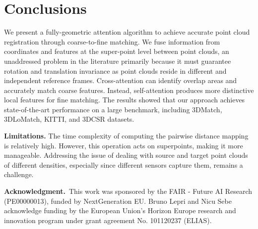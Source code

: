 \section{Conclusions}
We present a fully-geometric attention algorithm to achieve accurate point cloud registration through coarse-to-fine matching.
We fuse information from coordinates and features at the super-point level between point clouds, an unaddressed problem in the literature primarily because it must guarantee rotation and translation invariance as point clouds reside in different and independent reference frames.
Cross-attention can identify overlap areas and accurately match coarse features.
Instead, self-attention produces more distinctive local features for fine matching.
The results showed that our approach achieves state-of-the-art performance on a large benchmark, including 3DMatch, 3DLoMatch, KITTI, and 3DCSR datasets.

\noindent \textbf{Limitations.}
The time complexity of computing the pairwise distance mapping is relatively high. However, this operation acts on superpoints, making it more manageable. 
Addressing the issue of dealing with source and target point clouds of different densities, especially since different sensors capture them, remains a challenge.

\footnotesize\noindent\textbf{Acknowledgment.}~This work was sponsored by the FAIR - Future AI Research (PE00000013), funded by NextGeneration EU.
Bruno Lepri and Nicu Sebe acknowledge funding by the European Union’s Horizon Europe research and innovation program under grant agreement No. 101120237 (ELIAS).